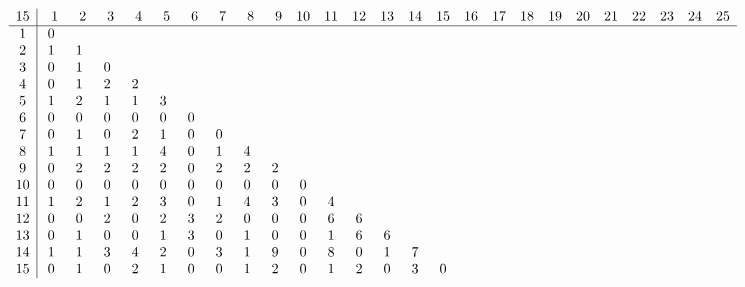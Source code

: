 \begin{landscape}
\[
\begin{array}{c|ccccccccccccccccccccccccc}\addcontentsline{lot}{table}{\protect\numberline{}Dimensions of the Kernel of $\mathcal{L}_{r,c,15}$}
15&  \phantom{0}1&  \phantom{0}2&  \phantom{0}3&  \phantom{0}4&  \phantom{0}5&  \phantom{0}6&  \phantom{0}7&  \phantom{0}8&  \phantom{0}9& 10& 11& 12& 13& 14& 15& 16& 17& 18& 19& 20& 21& 22& 23& 24& 25\\
\hline
 1&  0&   &   &   &   &   &   &   &   &   &   &   &   &   &   &   &   &   &   &   &   &   &   &   &   \\
 2&  1&  1&   &   &   &   &   &   &   &   &   &   &   &   &   &   &   &   &   &   &   &   &   &   &   \\
 3&  0&  1&  0&   &   &   &   &   &   &   &   &   &   &   &   &   &   &   &   &   &   &   &   &   &   \\
 4&  0&  1&  2&  2&   &   &   &   &   &   &   &   &   &   &   &   &   &   &   &   &   &   &   &   &   \\
 5&  1&  2&  1&  1&  3&   &   &   &   &   &   &   &   &   &   &   &   &   &   &   &   &   &   &   &   \\
 6&  0&  0&  0&  0&  0&  0&   &   &   &   &   &   &   &   &   &   &   &   &   &   &   &   &   &   &   \\
 7&  0&  1&  0&  2&  1&  0&  0&   &   &   &   &   &   &   &   &   &   &   &   &   &   &   &   &   &   \\
 8&  1&  1&  1&  1&  4&  0&  1&  4&   &   &   &   &   &   &   &   &   &   &   &   &   &   &   &   &   \\
 9&  0&  2&  2&  2&  2&  0&  2&  2&  2&   &   &   &   &   &   &   &   &   &   &   &   &   &   &   &   \\
10&  0&  0&  0&  0&  0&  0&  0&  0&  0&  0&   &   &   &   &   &   &   &   &   &   &   &   &   &   &   \\
11&  1&  2&  1&  2&  3&  0&  1&  4&  3&  0&  4&   &   &   &   &   &   &   &   &   &   &   &   &   &   \\
12&  0&  0&  2&  0&  2&  3&  2&  0&  0&  0&  6&  6&   &   &   &   &   &   &   &   &   &   &   &   &   \\
13&  0&  1&  0&  0&  1&  3&  0&  1&  0&  0&  1&  6&  6&   &   &   &   &   &   &   &   &   &   &   &   \\
14&  1&  1&  3&  4&  2&  0&  3&  1&  9&  0&  8&  0&  1&  7&   &   &   &   &   &   &   &   &   &   &   \\
15&  0&  1&  0&  2&  1&  0&  0&  1&  2&  0&  1&  2&  0&  3&  0&   &   &   &   &   &   &   &   &   &   \\

\end{array}\]
\end{landscape}
